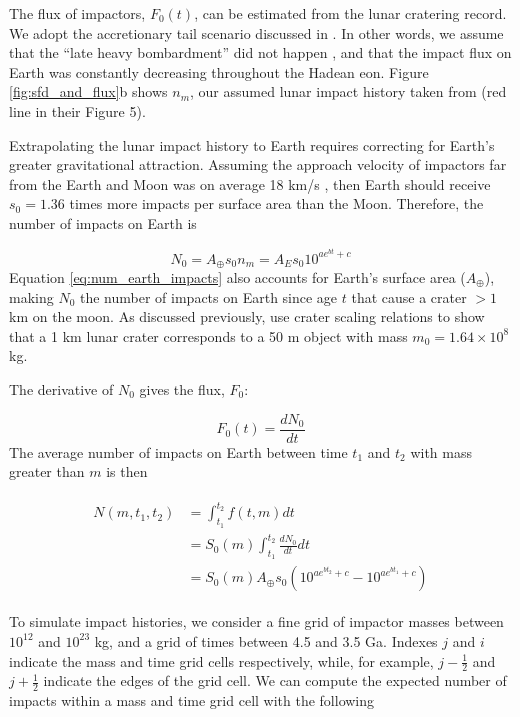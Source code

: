 \documentclass[preprint]{aastex63}
\begin{document}
The flux of impactors, $F_0(t)$, can be estimated from the lunar cratering record. We adopt the accretionary tail scenario discussed in \citet{Morbidelli_2018}. In other words, we assume that the ``late heavy bombardment'' did not happen \citep{Cartwright_2022,Hartmann_2019,Zellner_2017}, and that the impact flux on Earth was constantly decreasing throughout the Hadean eon. Figure \ref{fig:sfd_and_flux}b shows $n_m$, our assumed lunar impact history taken from \citet{Morbidelli_2018} (red line in their Figure 5).

Extrapolating the lunar impact history to Earth requires correcting for Earth's greater gravitational attraction. Assuming the approach velocity of impactors far from the Earth and Moon was on average 18 km/s \citep{Morbidelli_2018}, then Earth should receive $s_0 = 1.36$ times more impacts per surface area than the Moon. Therefore, the number of impacts on Earth is

\begin{equation}
  N_0 = A_\oplus s_0 n_m = A_E s_0 10^{a e^{b t} + c}
  \label{eq:num_earth_impacts}
\end{equation}
Equation \eqref{eq:num_earth_impacts} also accounts for Earth's surface area ($A_\oplus$), making $N_0$ the number of impacts on Earth since age $t$ that cause a crater $> 1$ km on the moon. As discussed previously, \citet{Morbidelli_2018} use crater scaling relations to show that a 1 km lunar crater corresponds to a 50 m object with mass $m_0 = 1.64 \times 10^8$ kg.

The derivative of $N_0$ gives the flux, $F_0$:

\begin{equation}
  F_0(t) = \frac{d N_0}{dt}
\end{equation}
The average number of impacts on Earth between time $t_1$ and $t_2$ with mass greater than $m$ is then

\begin{align}
\begin{split}
  N(m,t_1,t_2) &= \int_{t_1}^{t_2} f(t,m) dt \\
  &= S_0(m) \int_{t_1}^{t_2} \frac{d N_0}{dt} dt \\
  &= S_0(m) A_\oplus s_0 \left( 10^{a e^{b t_2} + c} - 10^{a e^{b t_1} + c} \right)
\end{split}
\end{align}

To simulate impact histories, we consider a fine grid of impactor masses between $10^{12}$ and $10^{23}$ kg, and a grid of times between 4.5 and 3.5 Ga. Indexes $j$ and $i$ indicate the mass and time grid cells respectively, while, for example, $j-\frac{1}{2}$ and $j+\frac{1}{2}$ indicate the edges of the grid cell. We can compute the expected number of impacts within a mass and time grid cell with the following
\end{document}
